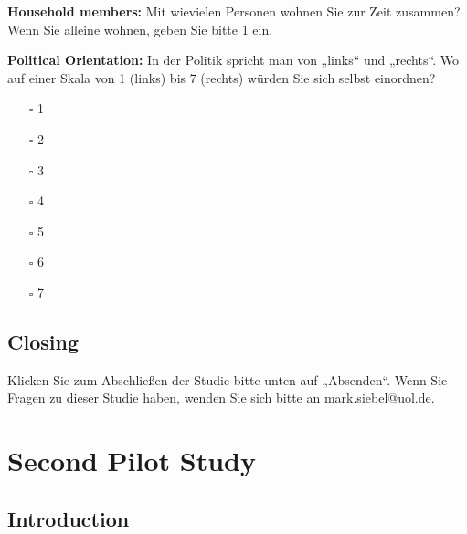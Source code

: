 \documentclass[egregdoesnotlikesansseriftitles]{scrartcl}
\begin{document}
\vspace{1em}
\noindent\textbf{Household members:} Mit wievielen Personen wohnen Sie zur Zeit zusammen? Wenn Sie alleine wohnen, geben Sie bitte 1 ein.

\vspace{1em}
\noindent\textbf{Political Orientation:} In der Politik spricht man von „links“ und „rechts“. Wo auf einer Skala von 1 (links) bis 7 (rechts) würden Sie sich selbst einordnen?
\begin{itemize}
   \item[$\square$] 1
   \item[$\square$] 2
   \item[$\square$] 3
   \item[$\square$] 4
   \item[$\square$] 5
   \item[$\square$] 6
   \item[$\square$] 7
\end{itemize}


\subsection*{Closing}
Klicken Sie zum Abschließen der Studie bitte unten auf „Absenden“. Wenn Sie Fragen zu dieser Studie haben, wenden Sie sich bitte an mark.siebel@uol.de.


\clearpage
\section{Second Pilot Study}\label{sec:app_pilot_2}
\subsection*{Introduction}
\end{document}

